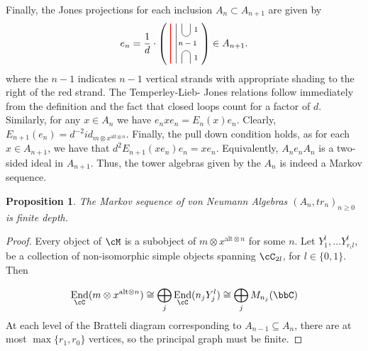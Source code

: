 \documentclass[11pt]{article}
\theoremstyle{plain}
\newtheorem{prop}[thm]{Proposition}
\theoremstyle{definition}
\DeclareMathOperator{\End}{End}
\newcommand{\xalt}{x^{\text{alt}\otimes n}}
\begin{document}
Finally, the Jones projections for each inclusion $A_{n}\subset A_{n+1}$ are given by
\begin{equation}\label{eq:JonesProjections}
e_n=
\frac1d\cdot
\left(\,\,
\begin{tikzpicture}[baseline=-.1cm]
	\draw[thick, red] (-.3,-.7) -- (-.3,.7);
	\draw (-.1,-.7) -- (-.1,.7);
	\draw (.1,-.7) -- (.1,-.4) arc (180:0:.15cm) -- (.4,-.7);
	\draw (.1,.7) -- (.1,.4) arc (-180:0:.15cm) -- (.4,.7);
	\node at (.3,0) {\scriptsize{$n-1$}};
	\node at (.6,.5) {\scriptsize{$1$}};
	\node at (.6,-.5) {\scriptsize{$1$}};
\end{tikzpicture}
\right)
\in
A_{n+1}.
\end{equation}
where the $n-1$ indicates $n-1$ vertical strands with appropriate shading to the right of the red strand. The Temperley-Lieb- %
Jones relations follow immediately from the definition and the fact that closed loops count for a factor of $d$. Similarly, 
for any $x\in A_n$ we have $e_nxe_n=E_n(x)e_n$. Clearly, $E_{n+1}(e_n)=d^{-2}id_{m \otimes \xalt}$. Finally, the pull 
down condition %
holds, as for each $x\in A_{n+1}$, we have that $d^2 E_{n+1}(xe_n)e_n=xe_n$. Equivalently, $A_{n} e_n A_n$ is a 
two-sided ideal in $A_{n+1}$. Thus, the tower algebras given by the $A_n$ is indeed a Markov sequence.
 
\begin{prop}
The Markov sequence of von Neumann Algebras $(A_n, tr_n)_{n\geq 0}$ is finite depth.
\end{prop}

\begin{proof}
	Every object of $\cM$ is a subobject of $m\otimes \xalt$ for some $n$. Let $Y^l_1,\ldots Y^l_{r_il}$, be a collection of non-isomorphic simple objects spanning $\cC_{2l}$, for $l\in\{0,1\}$. Then 

	\[\End_{\cC}(m\otimes\xalt)\cong \bigoplus\limits_{j}\End_{\cC}(n_j Y^l_j) \cong \bigoplus\limits_{j}M_{n_j}(\bbC)\]
	At each level of the Bratteli diagram corresponding to $A_{n-1}\subseteq A_n$, 
	there are at most $\max\{r_1,r_0\}$ vertices, so the principal graph must be finite. 
\end{proof}
\end{document}
